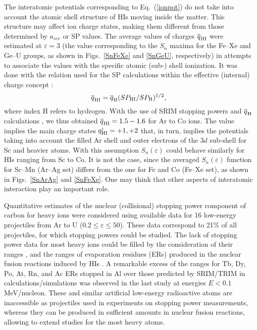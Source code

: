\documentclass[aps,pra,twocolumn,amsmath,amssymb,floatfix]{revtex4-2}
\begin{document}
The interatomic potentials corresponding to  Eq.~(\ref{ionpot}) do not take into account the atomic shell structure of HIs moving inside the matter. This structure may affect ion charge states, making them different from those determined by $a_{scr}$ or SP values. The average values of charges $\overline{q}_{\rm HI}$ were estimated at $\varepsilon = 3$ (the value corresponding to the $S_{n}$ maxima for the Fe--Xe and Ge--U groups, as shown in Figs.~\ref{SnFeXe} and \ref{SnGeU}, respectively) in attempts to associate the values with the specific atomic (sub-) shell ionization. It was done with the relation used for the SP calculations within the effective (internal) charge concept \cite{SRIM,BrownMoak72,Ziegler77,AnthLanf82,Abdess92,Saga2015,Ziegler80,Barb2010_2}:
\begin{equation}\label{qinHIs}
  \overline{q}_{\rm HI} =  \overline{q}_{\rm H} (SP_{\rm HI} / SP_{\rm H})^{1/2},
\end{equation}
where index H refers to hydrogen. With the use of SRIM stopping powers and $\overline{q}_{\rm H}$ calculations \cite{Ziegler80}, we thus obtained $\overline{q}_{\rm HI} = 1.5-1.6$ for Ar to Co ions. The value implies the main charge states $q^{i}_{\rm HI} = +1, +2$ that, in turn, implies the potentials taking into account the filled Ar shell and outer electrons of the $3d$ sub-shell for Sc and heavier atoms. With this assumption $S_{n}(\varepsilon)$ could behave similarly for HIs ranging from Sc to Co. It is not the case, since the averaged $S_{n}(\varepsilon)$ function for Sc--Mn (Ar--Ag set) differs from the one for Fe and Co (Fe--Xe set), as shown in Figs.~\ref{SnArAg} and \ref{SnFeXe}. One may think that other aspects of interatomic interaction play an important role.

Quantitative estimates of the nuclear (collisional) stopping power component of carbon for heavy ions were considered using available data for 16 low-energy projectiles from Ar to U ($0.2 \leqslant \varepsilon \leqslant 50$). These data correspond to 21\% of all projectiles, for which stopping powers could be studied. The lack of stopping power data for most heavy ions could be filled by the consideration of their ranges \cite{Powers68,Grande88}, and the ranges of evaporation residues (ERs) produced in the nuclear fusion reactions induced by HIs \cite{SagaRange19}. A remarkable excess of the ranges for Tb, Dy, Po, At, Rn, and Ac ERs stopped in Al over those predicted by SRIM/TRIM in calculations/simulations was observed in the last study at energies $E < 0.1$ MeV/nucleon. These and similar artificial low-energy radioactive atoms are inaccessible as projectiles used in experiments on stopping power  measurements, whereas they can be produced in sufficient amounts in nuclear fusion reactions, allowing to extend studies for the most heavy atoms.
\end{document}
